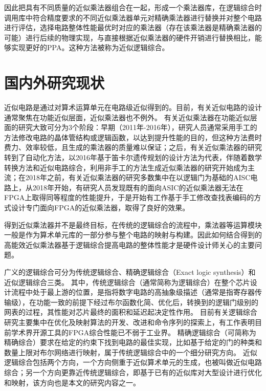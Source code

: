 因此把具有不同质量的近似乘法器组合在一起，形成一个乘法器库，在逻辑综合时调用库中符合精度要求的不同近似乘法器单元对精确乘法器进行替换并对整个电路进行评估，选择电路整体性能最优时对应的乘法器（存在该乘法器是精确乘法器的可能）进行后续的物理实现，与直接根据近似乘法器的硬件开销进行替换相比，能够实现更好的PPA。这种方法被称为近似逻辑综合。


\section{国内外研究现状}


近似电路是通过对算术运算单元在电路级近似得到的。目前，有关近似电路的设计通常聚焦在功能近似层面\cite{AC:ALS:survey}，近似乘法器也不例外。
有关近似乘法器在功能近似层面的研究大致可分为3个阶段：早期（2011年-2016年），研究人员通常采用手工的方法修改电路的晶体管结构\cite{AC:AM:IMPACT}或逻辑函数\cite{AC:AM:KMap}，以达到提升性能的目的，但这种方法费时费力、效率较低，且生成的乘法器的质量难以保证；之后，有关近似乘法器的研究转到了自动化方法，以2016年基于笛卡尔遗传规划的设计方法为代表\cite{AC:AM:CGP_2016}，伴随着数学转换方法\cite{AC:AM:OU}和近似电路综合\cite{AC:ALS:ALSRAC}，利用非手工的方法生成近似乘法器的研究开始成为主流；在2018年之前，有关近似乘法器的研究多数集中在以逻辑门为基础的AISC电路上，从2018年开始，有研究人员发现既有的面向ASIC的近似乘法器无法在FPGA上取得同等程度的性能提升，于是开始有工作基于手工修改查找表编码的方式设计专门面向FPGA的近似乘法器，取得了良好的效果\cite{AC:AM:FPGA:SMApproxLib}。


得到近似乘法器并不是最终目标，在传统的逻辑综合的流程中，乘法器等运算模块一般是作为算术单元库的一部分参与整个电路的映射与构建。因此如何结合得到的高能效近似乘法器基于逻辑综合提高电路的整体性能才是硬件设计师关心的主要问题。

广义的逻辑综合可分为传统逻辑综合、精确逻辑综合（Exact logic synthesis）和近似逻辑综合三类。
其中，传统逻辑综合（通常简称为逻辑综合）在整个芯片设计流程中处于最上游的位置，是指将数字电路的高抽象级描述（通常是指寄存器传输级），在功能一致的前提下经过布尔函数化简、优化后，转换到的逻辑门级别的网表的过程，其性能对芯片最终的面积和延迟起决定性作用。
目前有关逻辑综合研究主要集中在优化及映射算法的开发、改进\cite{LS:Narrowing}和命令序列的探索上\cite{LS:Bulls-Eye}，有工作表明目前学术界开源工具的FPGA综合性能已不弱于工业界\cite{LS:Narrowing}。
精确逻辑综合（可简称为精确综合）要求在给定的约束下找到电路的最佳实现，比如基于给定的门的种类和数量上限对布尔网络进行映射\cite{LS:exact_syn}，属于传统逻辑综合中的一个细分研究方向。
近似逻辑综合包括两个方向，一个方向侧重于近似算术单元的生成，也被叫做近似电路综合；另一个方向更靠近传统逻辑综合，即基于已有的近似库对大型设计进行优化和映射，该方向也是本文的研究内容之一。


